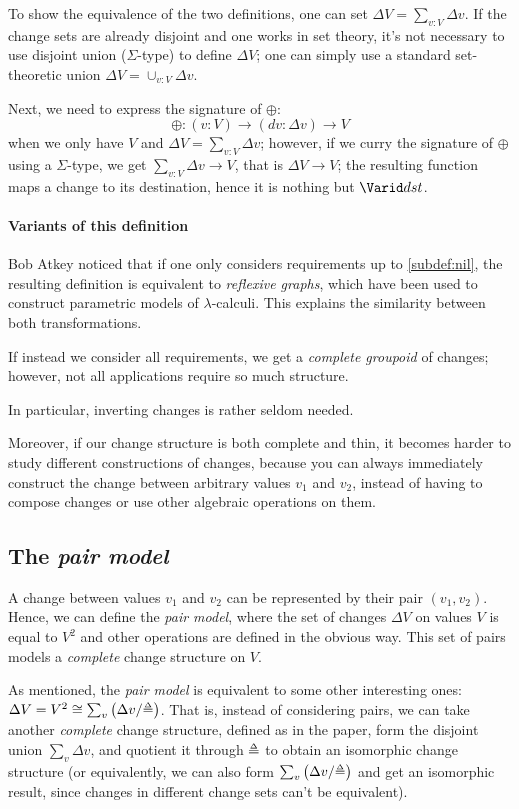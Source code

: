 To show the equivalence of the two definitions, one can set
$\Delta V = \sum_{v: V} \Delta v$. If the change sets are already disjoint and
one works in set theory, it's not necessary to use disjoint union
($\Sigma$-type) to define $\Delta V$; one can simply use a standard
set-theoretic union $\Delta V = \cup_{v: V} \Delta v$.

Next, we need to express the signature of $\oplus$:
\[\oplus: (v: V) \to (dv: \Delta v) \to V\]
when we only have $V$ and $\Delta V = \sum_{v: V} \Delta v$; however, if we
curry the signature of $\oplus$ using a $\Sigma$-type, we get
$\sum_{v: V} \Delta v \to V$, that is $\Delta V \to V$; the resulting function maps
a change to its destination, hence it is nothing but $\Term{dst}$.

\paragraph{Variants of this definition}
Bob Atkey noticed that if one only considers requirements up to
\cref{subdef:nil}, the resulting definition is equivalent to \emph{reflexive
  graphs}, which have been used to construct parametric models of
$\lambda$-calculi. This explains the similarity between both transformations.

If instead we consider all requirements, we get a \emph{complete groupoid} of
changes; however, not all applications require so much structure.

In particular, inverting changes is rather seldom needed.

Moreover, if our change structure is both complete and thin, it becomes harder
to study different constructions of changes, because you can always immediately
construct the change between arbitrary values $v_1$ and $v_2$, instead of having
to compose changes or use other algebraic operations on them.

\subsection{The \emph{pair model}}
A change between values $v_1$ and $v_2$ can be represented by their pair
$(v_1, v_2)$. Hence, we can define the \emph{pair model}, where the set of
changes $\Delta V$ on values $V$ is equal to $V^2$ and other operations are
defined in the obvious way. This set of pairs models a \emph{complete} change
structure on $V$.

As mentioned, the \emph{pair model} is equivalent to some other interesting
ones: $\Delta V = V^2 \cong \sum_v \left(\Delta v / \mathbin{\Doe}\right)$. That is, instead of
considering pairs, we can take another \emph{complete} change structure, defined
as in the paper, form the disjoint union $\sum_v \Delta v$, and quotient it
through $\Doe$ to obtain an isomorphic change structure (or equivalently, we
can also form $\sum_v \left(\Delta v / \mathbin{\Doe}\right)$ and get an isomorphic result, since
changes in different change sets can't be equivalent).

